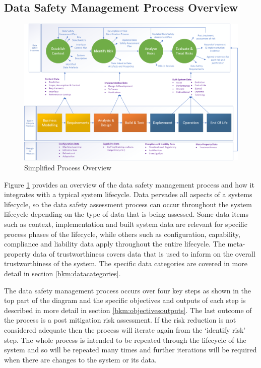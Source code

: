 \subsection{Data Safety Management Process Overview}
\begin{figure}[hb]
\centering
\includegraphics[angle=90,scale=0.7]{images/process_diagram}
\caption{Simplified Process Overview}
\label{fig:process}
\end{figure}
Figure \ref{fig:process} provides an overview of the data safety management process and how it integrates with a typical system lifecycle. Data pervades all aspects of a systems lifecycle, so the data safety assessment process can occur throughout the system lifecycle depending on the type of data that is being assessed. Some data items such as context, implementation and built system data are relevant for specific process phases of the lifecycle, while others such as configuration, capability, compliance and liability data apply throughout the entire lifecycle. The meta-property data of trustworthiness covers data that is used to inform on the overall trustworthiness of the system. The specific data categories are covered in more detail in section \ref{bkm:datacategories}.

The data safety management process occurs over four key steps as shown in the top part of the diagram and the specific objectives and outputs of each step is described in more detail in section \ref{bkm:objectivesoutputs}. The last outcome of the process is a post mitigation risk assessment. If the risk reduction is not considered adequate then the process will iterate again from the `identify risk' step. The whole process is intended to be repeated through the lifecycle of the system and so will be repeated many times and further iterations will be required when there are changes to the system or its data.

